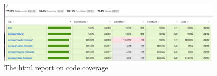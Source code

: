 \begin{figure}[H]
\begin{center}
\includegraphics[width=11cm]{figures/testing_coverage_metrics}
\end{center}
\caption{The html report on code coverage}
\label{fig:testing_coverage_metrics}
\end{figure}
